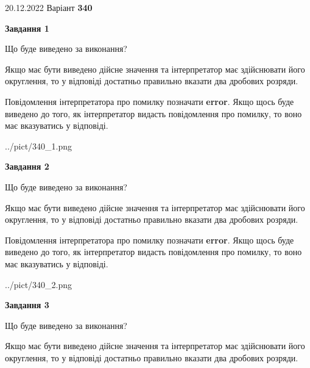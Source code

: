 \documentclass[12pt, ukrainian]{article}
\begin{document}
{20.12.2022 Варіант \No \textbf { 340 }\par}
{
\begin {Large}

{\begin {center}\textbf{Завдання 1}\end {center}}\par
Що буде виведено за виконання? \par

Якщо має бути виведено дійсне значення та інтерпретатор має здійснювати його округлення, 
то у відповіді достатньо правильно вказати два дробових розряди.

Повідомлення інтерпретатора про помилку позначати \textbf{error}.
Якщо щось буде виведено до того, як інтерпретатор видасть повідомлення про помилку, 
то воно має вказуватись у відповіді. \par

\begin{center}
	{../pict/340_1.png}
\end{center}
\newpage

{\begin {center}\textbf{Завдання 2}\end {center}}\par
Що буде виведено за виконання? \par

Якщо має бути виведено дійсне значення та інтерпретатор має здійснювати його округлення, 
то у відповіді достатньо правильно вказати два дробових розряди.

Повідомлення інтерпретатора про помилку позначати \textbf{error}.
Якщо щось буде виведено до того, як інтерпретатор видасть повідомлення про помилку, 
то воно має вказуватись у відповіді. \par

\begin{center}
	{../pict/340_2.png}
\end{center}
\newpage

{\begin {center}\textbf{Завдання 3}\end {center}}\par
Що буде виведено за виконання? \par

Якщо має бути виведено дійсне значення та інтерпретатор має здійснювати його округлення, 
то у відповіді достатньо правильно вказати два дробових розряди.


\end{Large}}
\end{document}
